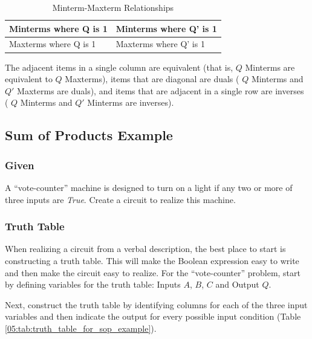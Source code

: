 \begin{table}[H]
  \sffamily
  \begin{center}
    \begin{tabular}{|l|l|} 
      \hline
      Minterms where Q is 1 & Minterms where Q' is 1 \\
      \hline
      Maxterms where Q is 1 & Maxterms where Q' is 1 \\
      \hline
    \end{tabular}
  \end{center}
  \caption{Minterm-Maxterm Relationships}
  \label{05:tab:minterm_and_maxterm_relationships}
\end{table}

The adjacent items in a single column are equivalent (that is,  $ Q $ Minterms are equivalent to  $ Q $ Maxterms), items that are diagonal are duals ( $ Q $ Minterms and  $ Q' $ Maxterms are duals), and items that are adjacent in a single row are inverses ( $ Q $ Minterms and  $ Q' $ Minterms are inverses). 

\subsection{Sum of Products Example}
\label{05:subsubsec:sum_of_products_example}

\subsubsection{Given}
\label{05:subsubsec:given_sop_example}

A ``vote-counter'' machine is designed to turn on a light if any two or more of three inputs are \emph{True}. Create a circuit to realize this machine. 

\subsubsection{Truth Table}
\label{05:subsubsec:truth_table_sop_example}

When realizing a circuit from a verbal description, the best place to start is constructing a truth table. This will make the Boolean expression easy to write and then make the circuit easy to realize. For the ``vote-counter'' problem, start by defining variables for the truth table: Inputs  $ A $,  $ B $,  $ C $ and Output  $ Q $. 

Next, construct the truth table by identifying columns for each of the three input variables and then indicate the output for every possible input condition (Table \ref{05:tab:truth_table_for_sop_example}).

